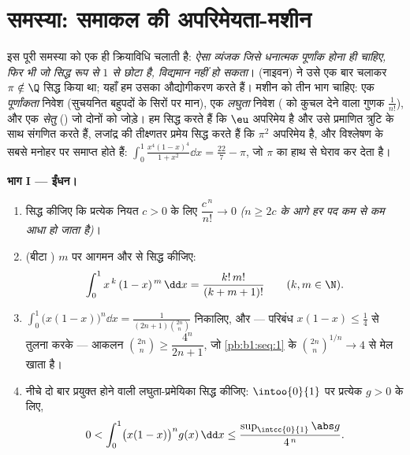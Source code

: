 \section{समस्या: समाकल की अपरिमेयता-मशीन}

\begin{problem}
\label{pb:b1:integration:1}
इस पूरी समस्या को एक ही क्रियाविधि चलाती है: \emph{ऐसा व्यंजक जिसे धनात्मक
पूर्णांक होना ही चाहिए, फिर भी जो सिद्ध रूप से $1$ से छोटा है, विद्यमान नहीं
हो सकता}।  (नाइवन) ने उसे एक बार चलाकर $\pi
\notin \Q$ सिद्ध किया था; यहाँ हम उसका औद्योगीकरण करते हैं। मशीन को तीन भाग
चाहिए: एक \emph{पूर्णांकता} निवेश (सुचयनित बहुपदों के सिरों पर मान), एक
\emph{लघुता} निवेश ( को कुचल देने वाला गुणक $\frac{1}{n!}$), और एक
\emph{सेतु} () जो दोनों को जोड़े। हम सिद्ध करते हैं कि $\eu$
अपरिमेय है और उसे प्रमाणित त्रुटि के साथ संगणित करते हैं, लजांद्र की
तीक्ष्णतर प्रमेय सिद्ध करते हैं कि $\pi^2$ अपरिमेय है, और विश्लेषण के सबसे
मनोहर  पर समाप्त होते हैं: $\int_0^1 \frac{x^4(1 - x)^4}{1 + x^2}\dd x
= \frac{22}{7} - \pi$, जो $\pi$ का हाथ से घेराव कर देता
है।

\medskip \noindent\textbf{भाग I --- ईंधन।}
\begin{enumerate}
  \item सिद्ध कीजिए कि प्रत्येक नियत $c > 0$ के लिए $\dfrac{c^{\,n}}{n!} \to
  0$ \emph{($n \geq 2c$ के आगे हर पद कम से कम आधा हो जाता है)}।
  \item (बीटा ) $m$ पर आगमन और  से सिद्ध कीजिए:
        \[
        \int_0^1 x^{\,k}\,(1 - x)^{\,m}\,\dd x =
        \frac{k!\,m!}{(k + m + 1)!}
        \qquad (k, m \in \N).
        \]
  \item $\displaystyle\int_0^1 \bigl(x(1-x)\bigr)^n \dd x =
  \frac{1}{(2n+1)\binom{2n}{n}}$ निकालिए, और --- परिबंध $x(1 - x) \leq
  \frac14$ से तुलना करके --- आकलन $\binom{2n}{n} \geq \dfrac{4^n}{2n+1}$, जो
  \cref{pb:b1:seq:1} के $\binom{2n}{n}^{1/n} \to 4$ से मेल खाता है।
  \item नीचे दो बार प्रयुक्त होने वाली लघुता-प्रमेयिका सिद्ध कीजिए:
  $\intoo{0}{1}$ पर प्रत्येक  $g > 0$ के लिए,
        \[
        0 < \int_0^1 \bigl(x(1-x)\bigr)^n g(x)\,\dd x
        \leq \frac{\sup_{\intcc{0}{1}}\abs g}{4^{\,n}} .
        \]
\end{enumerate}


\end{problem}
